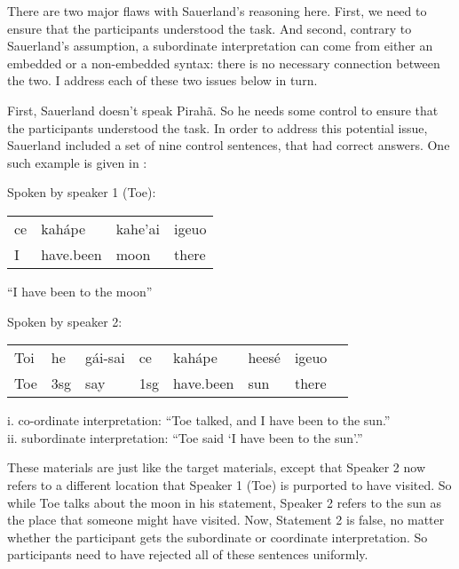 \documentclass{article}
\begin{document}
There are two major flaws with Sauerland’s reasoning here. First, we need to ensure that the participants understood the task. And second, contrary to Sauerland's assumption, a subordinate interpretation can come from either an embedded or a non-embedded syntax: there is no necessary connection between the two.  I address each of these two issues below in turn.

First, Sauerland doesn't speak Pirahã. So he needs some control to ensure that the participants understood the task. In order to address this potential issue, Sauerland included a set of nine control sentences, that had correct answers.  One such example is given in :

\begin{myexample}
\label{sauerland_ex_cont}
\begin{examples}
\item \label{sauerland_ex1_cont} Spoken by speaker 1 (Toe):\\
\begin{tabular}{l l l l}
ce & kahápe & kahe’ai & igeuo \\ 
I & have.been & moon & there\\
\end{tabular}

``I have been to the moon''

\item \label{sauerland_ex2_cont} Spoken by speaker 2:\\
\begin{tabular}{l l l l l l l l}
Toi & he & gái-sai & ce & kahápe & heesé & igeuo \\
Toe & 3sg & say & 1sg & have.been & sun & there\\
\end{tabular}

i. co-ordinate interpretation: ``Toe talked, and I have been to the sun.''\\
ii. subordinate interpretation: ``Toe said ‘I have been to the sun’.''
\end{examples}
\end{myexample}

These materials are just like the target materials, except that Speaker 2 now refers to a different location that Speaker 1 (Toe) is purported to have visited.  So while Toe talks about the moon in his statement, Speaker 2 refers to the sun as the place that someone might have visited.  Now, Statement 2 is false, no matter whether the participant gets the subordinate or coordinate interpretation.  So participants need to have rejected all of these sentences uniformly.
\end{document}

